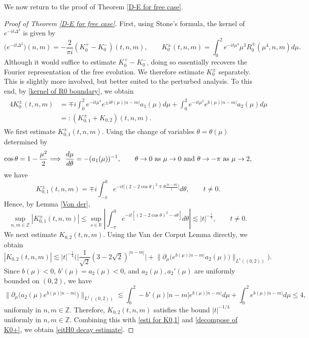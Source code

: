 \documentclass[reqno, 11pt]{amsart}
\newcommand\R{\mathbb{R}}
\newcommand\Z{\mathbb{Z}}
\numberwithin{equation}{section}
\begin{document}
We now return to the proof of Theorem \ref{D-E for free case}.
\begin{proof}[Proof of Theorem \ref{D-E for free case}]
First, using Stone's formula, the kernel of $e^{-it\Delta^2}$ is given by
\begin{equation*}%
\big(e^{-it\Delta^2}\big)(n,m)=-\frac{2}{\pi i}(K^{+}_{0}-K^{-}_{0})(t,n,m),\qquad K^{\pm}_{0}(t,n,m)=\int_{0}^{2}e^{-it\mu^4}\mu^3R^{\mp}_0(\mu^4,n,m)d\mu.
\end{equation*}
 Although it would suffice to estimate $K_0^+-K_0^-$, doing so essentially recovers the Fourier representation of the free evolution. We therefore estimate $K_0^\pm$ separately. This is slightly more involved, but better suited to the perturbed analysis. To this end, by \eqref{kernel of R0 boundary}, we obtain
\begin{align}\label{decompose of K0+}
\begin{split}
4K^{\pm}_0(t,n,m)&=\mp i\int_{0}^{2}e^{-it\mu^4} e^{\pm i\theta(\mu)|n-m|}a_1(\mu)d\mu+\int_{0}^{2}e^{-it\mu^4} e^{b(\mu)|n-m|}a_2(\mu)d\mu\\
&=:(K^{\pm}_{0,1}+K_{0,2})(t,n,m).
\end{split}
\end{align}
We first estimate $K_{0,1}^\pm(t,n,m)$. Using the change of variables
$\theta=\theta(\mu)$ determined by
\begin{equation}\label{varible substi1}
 \cos\theta=1-\frac{\mu^2}{2} \Longrightarrow\  \frac{d\mu}{d\theta}=-(a_1(\mu))^{-1},\qquad \theta\rightarrow0\ {\rm as}\ \mu\rightarrow0\ {\rm and}\ \theta\rightarrow-\pi\ {\rm as}\ \mu\rightarrow2,
\end{equation}
we have
 \begin{equation*}
 K^{\pm}_{0,1}(t,n,m)=\mp i\int_{-\pi}^{0}e^{-it\big[(2-2\cos\theta)^2\mp\theta\frac{|n-m|}{t}\big]}d\theta,\qquad t\neq0.
\end{equation*}
Hence, by Lemma \ref{Von der},
\begin{equation}\label{esti for K0,1}
\sup\limits_{n,m\in\Z}|K^{\pm}_{0,1}(t,n,m)|\leq\sup\limits_{s\in\R}\left|\int_{-\pi}^{0}e^{-it\left[(2-2\cos\theta)^2-s\theta\right]}d\theta\right|\lesssim |t|^{-\frac{1}{4}},\qquad t\neq0.
\end{equation}
We next estimate $K_{0,2}(t,n,m)$. Using the Van der Corput Lemma directly, we obtain
\begin{equation*}
|K_{0,2}(t,n,m)|\lesssim|t|^{-\frac{1}{4}}\Big(\Big|\frac{1}{\sqrt{2}}(3-2\sqrt{2})^{|n-m|}\Big|+\big\|\partial_{\mu}\big(e^{b(\mu)|n-m|}a_2(\mu)\big)\big\|_{L^{1}((0,2))}\Big).
\end{equation*}
Since $b(\mu)<0$, $b'(\mu)=a_2(\mu)<0$, and $a_2(\mu),a_2'(\mu)$ are uniformly bounded on $(0,2)$, we have
\begin{equation}\label{integral ebnm}
\big\|\partial_{\mu}\big(a_2(\mu)e^{b(\mu)|n-m|}\big)\big\|_{L^{1}((0,2))}\lesssim \int_{0}^{2}-b'(\mu)|n-m|e^{b(\mu)|n-m|}d\mu+\int_{0}^{2}e^{b(\mu)|n-m|}d\mu\leq4,
\end{equation}
uniformly in $n,m\in\Z$. Therefore, $K_{0,2}(t,n,m)$ satisfies the bound $|t|^{-1/4}$ uniformly in $n,m\in\Z$. Combining this with \eqref{esti for K0,1} and \eqref{decompose of K0+}, we obtain \eqref{eitH0 decay estimate}.
\end{proof}
\end{document}
